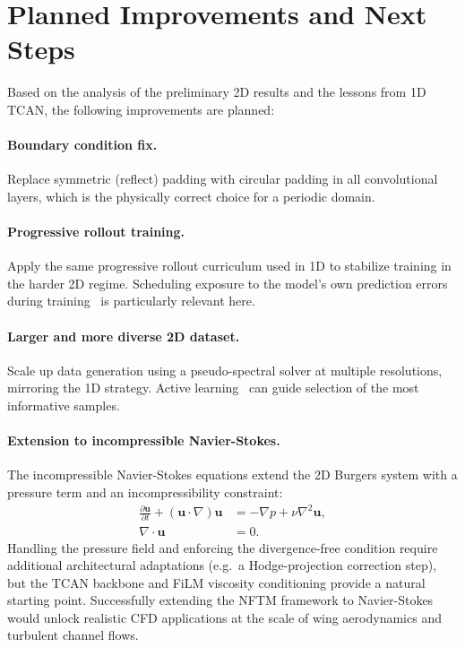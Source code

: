 \section{Planned Improvements and Next Steps}
\label{sec:2d_future_work}

Based on the analysis of the preliminary 2D results and the lessons from 1D TCAN, the following improvements are planned:

\paragraph{Boundary condition fix.}
Replace symmetric (reflect) padding with circular padding in all convolutional layers, which is the physically correct choice for a periodic domain.

\paragraph{Progressive rollout training.}
Apply the same progressive rollout curriculum used in 1D to stabilize training in the harder 2D regime. Scheduling exposure to the model's own prediction errors during training~\cite{lippe2023pderefiner} is particularly relevant here.

\paragraph{Larger and more diverse 2D dataset.}
Scale up data generation using a pseudo-spectral solver at multiple resolutions, mirroring the 1D strategy. Active learning~\cite{musekamp2025activelearning} can guide selection of the most informative samples.

\paragraph{Extension to incompressible Navier-Stokes.}
The incompressible Navier-Stokes equations extend the 2D Burgers system with a pressure term and an incompressibility constraint:
\begin{align}
  \frac{\partial \mathbf{u}}{\partial t} + (\mathbf{u} \cdot \nabla)\mathbf{u}
  &= -\nabla p + \nu \nabla^2 \mathbf{u}, \label{eq:ns_momentum} \\[4pt]
  \nabla \cdot \mathbf{u} &= 0. \label{eq:ns_incompressibility}
\end{align}
Handling the pressure field and enforcing the divergence-free condition require additional architectural adaptations (e.g.\ a Hodge-projection correction step), but the TCAN backbone and FiLM viscosity conditioning provide a natural starting point. Successfully extending the NFTM framework to Navier-Stokes would unlock realistic CFD applications at the scale of wing aerodynamics and turbulent channel flows.

